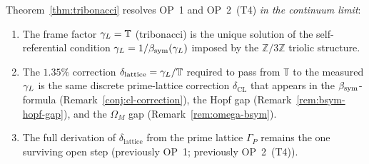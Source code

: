 \begin{remark}[OP~1/OP~2 (T4) resolution]
\label{rem:op1-tribonacci}
Theorem~\ref{thm:tribonacci} resolves OP~1 and OP~2~(T4)
\emph{in the continuum limit}:
\begin{enumerate}[label=(\roman*)]
 \item The frame factor $\gamma_L = \mathbb{T}$ (tribonacci) is
 the unique solution of the self-referential condition
 $\gamma_L = 1/\beta_{\mathrm{sym}}(\gamma_L)$ imposed by the $\mathbb{Z}/3\mathbb{Z}$
 triolic structure.
 \item The $1.35\%$ correction $\delta_{\mathrm{lattice}} = \gamma_L/\mathbb{T}$
 required to pass from $\mathbb{T}$ to the measured $\gamma_L$ is the
 same discrete prime-lattice correction $\delta_{\mathrm{CL}}$ that
 appears in the $\beta_{\mathrm{sym}}$-formula (Remark~\ref{conj:cl-correction}),
 the Hopf gap (Remark~\ref{rem:bsym-hopf-gap}), and the
 $\Omega_M$ gap (Remark~\ref{rem:omega-bsym}).
 \item The full derivation of $\delta_{\mathrm{lattice}}$ from the
 prime lattice $\Gamma_P$ remains the one surviving open step
 (previously OP~1; previously OP~2~(T4)).
\end{enumerate}
\end{remark}

